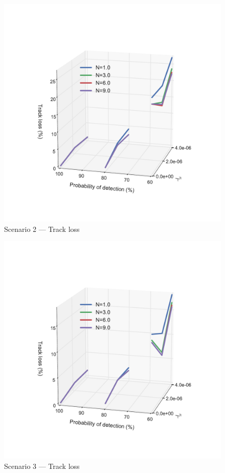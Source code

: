 {\begin{figure}
\includegraphics[height = .45\textheight]{Figures/plots/Scenario2_Tracking-TrackLoss.pdf}
\caption{Scenario 2 --- Track loss}\label{fig:scenario2_track_loss}
\end{figure}

\begin{figure}
\centering
\includegraphics[height = .45\textheight]{Figures/plots/Scenario3_Tracking-TrackLoss.pdf}
\caption{Scenario 3 --- Track loss}\label{fig:scenario3_track_loss}


\end{figure}}
